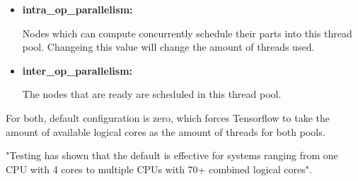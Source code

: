 \begin{itemize}[label={}]
        \begin{itemize}

          \item \textbf{intra\_op\_parallelism:}

                Nodes which can compute concurrently
                schedule their parts into this thread pool.
                Changeing this value will change the amount
                of threads used.\cite{tf_op}

          \item \textbf{inter\_op\_parallelism:}

                The nodes that are ready are scheduled in
                this thread pool.\cite{tf_op}

        \end{itemize}

        For both, default configuration is zero,
        which forces Tensorflow to take the amount of
        available logical cores as the amount of threads
        for both pools.

        "Testing has shown that the default is effective
        for systems ranging from one CPU with 4 cores to
        multiple CPUs with 70+ combined logical cores".
        \cite{tf_op}

\end{itemize}


